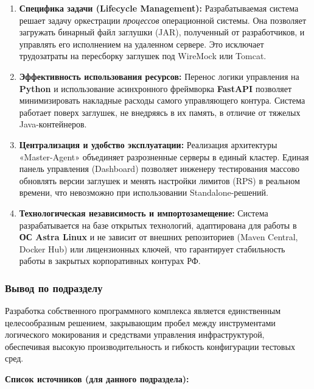 \documentclass[
]{article}
\begin{document}
\begin{enumerate}
\def\labelenumi{\arabic{enumi}.}
\item
  \textbf{Специфика задачи (Lifecycle Management):} Разрабатываемая
  система решает задачу оркестрации \emph{процессов} операционной
  системы. Она позволяет загружать бинарный файл заглушки (JAR),
  полученный от разработчиков, и управлять его исполнением на удаленном
  сервере. Это исключает трудозатраты на пересборку заглушек под
  WireMock или Tomcat.
\item
  \textbf{Эффективность использования ресурсов:} Перенос логики
  управления на \textbf{Python} и использование асинхронного фреймворка
  \textbf{FastAPI} позволяет минимизировать накладные расходы самого
  управляющего контура. Система работает поверх заглушек, не внедряясь в
  их память, в отличие от тяжелых Java-контейнеров.
\item
  \textbf{Централизация и удобство эксплуатации:} Реализация архитектуры
  «Master-Agent» объединяет разрозненные серверы в единый кластер.
  Единая панель управления (Dashboard) позволяет инженеру тестирования
  массово обновлять версии заглушек и менять настройки лимитов (RPS) в
  реальном времени, что невозможно при использовании Standalone-решений.
\item
  \textbf{Технологическая независимость и импортозамещение:} Система
  разрабатывается на базе открытых технологий, адаптирована для работы в
  \textbf{ОС Astra Linux} и не зависит от внешних репозиториев (Maven
  Central, Docker Hub) или лицензионных ключей, что гарантирует
  стабильность работы в закрытых корпоративных контурах РФ.
\end{enumerate}

\subsubsection{Вывод по
подразделу}\label{ux432ux44bux432ux43eux434-ux43fux43e-ux43fux43eux434ux440ux430ux437ux434ux435ux43bux443}

Разработка собственного программного комплекса является единственным
целесообразным решением, закрывающим пробел между инструментами
логического мокирования и средствами управления инфраструктурой,
обеспечивая высокую производительность и гибкость конфигурации тестовых
сред.

\textbf{Список источников (для данного подраздела):}
\end{document}

